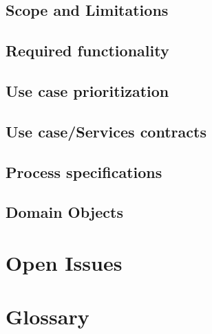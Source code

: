 \documentclass[10pt,a4paper]{article}
\begin{document}
\subsection{Scope and Limitations}
\subsection{Required functionality}
\subsection{Use case prioritization}
\subsection{Use case/Services contracts}
\subsection{Process specifications}
\subsection{Domain Objects}

\section{Open Issues}
\section{Glossary}
\end{document}
